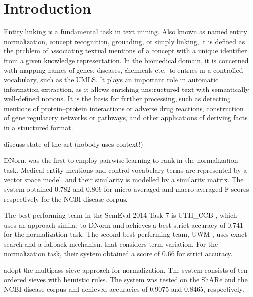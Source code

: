 \documentclass{bioinfo}
\begin{document}
\maketitle

\section{Introduction}

Entity linking is a fundamental task in text mining.
Also known as named entity normalization, concept recognition, grounding, or simply linking, it is defined as the problem of associating textual mentions of a concept with a unique identifier from a given knowledge representation.
In the biomedical domain, it is concerned with mapping names of genes, diseases, chemicals etc.\ to entries in a controlled vocabulary, such as the UMLS.
It plays an important role in automatic information extraction, as it allows enriching unstructured text with semantically well-defined notions.
It is the basis for further processing, such as detecting mentions of protein--protein interactions or adverse drug reactions, construction of gene regulatory networks or pathways, and other applications of deriving facts in a structured format.



discuss state of the art (nobody uses context!)



DNorm \citep{leaman-et-al:2013} was the first to employ pairwise learning to rank in the normalization task.
Medical entity mentions and control vocabulary terms are represented by a vector space model, and their similarity is modelled by a similarity matrix.
The system obtained 0.782 and 0.809 for micro-averaged and macro-averaged F-scores respectively for the NCBI disease corpus.  %

The best performing team in the SemEval-2014 Task 7 is UTH\_CCB \citep{zhang-et-al:2014:SemEval}, which uses an approach similar to DNorm and achieves a best strict accuracy of 0.741 for the normalization task.  %
The second-best performing team, UWM \citep{ghiasvand-kate:2014:SemEval}, uses exact search and a fallback mechanism that considers term variation.
For the normalization task, their system obtained a score of 0.66 for strict accuracy.  %

\cite{dsouza-ng:2015:ACL-IJCNLP} adopt the multipass sieve approach for normalization.
The system consists of ten ordered sieves with heuristic rules.
The system was tested on the ShARe and the NCBI disease corpus and achieved accuracies of 0.9075 and 0.8465, respectively.
\end{document}
